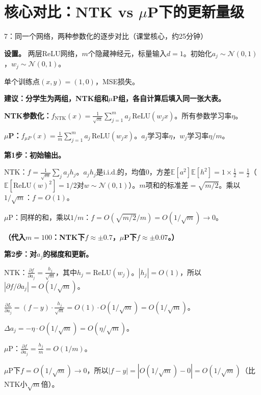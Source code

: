 \documentclass[11pt,a4paper]{article}
\newcommand{\E}{\mathbb{E}}
\newcommand{\cN}{\mathcal{N}}
\begin{document}
\section{核心对比：NTK vs $\mu$P下的更新量级}

\begin{handcalc}{7：同一个网络，两种参数化的逐步对比（课堂核心，约25分钟）}

\textbf{设置。} 两层ReLU网络，$m$个隐藏神经元，标量输入$d=1$。初始化$a_j\sim\cN(0,1)$，$w_j\sim\cN(0,1)$。

单个训练点$(x,y)=(1,0)$，MSE损失。

\textbf{建议：分学生为两组，NTK组和$\mu$P组，各自计算后填入同一张大表。}

\tcblower

\textbf{NTK参数化：}$f_{\text{NTK}}(x) = \frac{1}{\sqrt{m}}\sum_{j=1}^m a_j\,\text{ReLU}(w_j x)$。所有参数学习率$\eta$。

\textbf{$\mu$P：}$f_{\mu P}(x) = \frac{1}{m}\sum_{j=1}^m a_j\,\text{ReLU}(w_j x)$。$a_j$学习率$\eta$，$w_j$学习率$\eta/m$。

\bigskip
\textbf{第1步：初始输出。}

NTK：$f = \frac{1}{\sqrt{m}}\sum_j a_j h_j$。$a_j h_j$是i.i.d.的，均值0，方差$\E[a^2]\E[h^2]=1\times\frac{1}{2}=\frac{1}{2}$（$\E[\text{ReLU}(w)^2]=1/2$对$w\sim\cN(0,1)$）。$m$项和的标准差$=\sqrt{m/2}$。乘以$1/\sqrt{m}$：$f = O(1)$。

$\mu$P：同样的和，乘以$1/m$：$f = O(\sqrt{m/2}/m) = O(1/\sqrt{m}) \to 0$。

\textbf{（代入$m=100$：NTK下$f\approx\pm 0.7$，$\mu$P下$f\approx\pm 0.07$。）}

\bigskip
\textbf{第2步：对$a_j$的梯度和更新。}

NTK：$\frac{\partial f}{\partial a_j} = \frac{h_j}{\sqrt{m}}$，其中$h_j=\text{ReLU}(w_j)$。$|h_j|=O(1)$，所以$|\partial f/\partial a_j|=O(1/\sqrt{m})$。

$\frac{\partial L}{\partial a_j} = (f-y)\cdot\frac{h_j}{\sqrt{m}} = O(1)\cdot O(1/\sqrt{m}) = O(1/\sqrt{m})$。

$\Delta a_j = -\eta\cdot O(1/\sqrt{m}) = O(\eta/\sqrt{m})$。

\medskip
$\mu$P：$\frac{\partial f}{\partial a_j} = \frac{h_j}{m} = O(1/m)$。

$\mu$P下$f=O(1/\sqrt{m})\to 0$，所以$|f-y|=|O(1/\sqrt{m})-0|=O(1/\sqrt{m})$（比NTK小$\sqrt{m}$倍）。


\end{handcalc}
\end{document}
